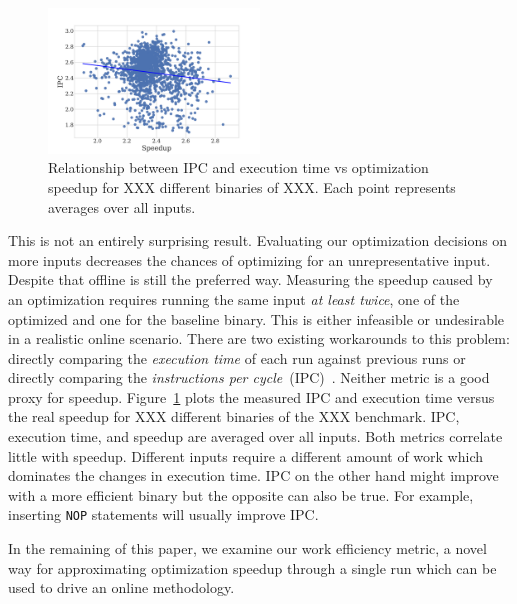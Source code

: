 \begin{figure}[t]
    \centering
    \includegraphics[width=0.5\textwidth]{figs/motivation-metric.pdf}
    \caption{Relationship between IPC and execution time vs optimization speedup for XXX different binaries of XXX. Each point represents
	averages over all inputs.}
    \label{fig:motivation-metric}
\end{figure}

This is not an entirely surprising result. Evaluating our optimization decisions on more inputs decreases the chances of optimizing for an
unrepresentative input. Despite that offline \itercomp is still the preferred way. Measuring the speedup caused by an optimization requires
running the same input \textit{at least twice}, one of the optimized and one for the baseline binary. This is either infeasible or
undesirable in a realistic online \itercomp scenario. There are two existing workarounds to this problem: directly comparing the
\textit{execution time} of each run against previous runs or directly comparing the \textit{instructions per cycle}~(IPC)~\citep{fursin07}.
Neither metric is a good proxy for speedup. Figure~\ref{fig:motivation-metric} plots the measured IPC and execution time versus the real
speedup for XXX different binaries of the XXX benchmark. IPC, execution time, and speedup are averaged over all inputs. Both metrics
correlate little with speedup. Different inputs require a different amount of work which dominates the changes in execution time. IPC on
the other hand might improve with a more efficient binary but the opposite can also be true. For example, inserting \texttt{NOP} statements
will usually improve IPC. 

In the remaining of this paper, we examine our work efficiency metric, a novel way for approximating optimization speedup through a single
run which can be used to drive an online \itercomp methodology.

